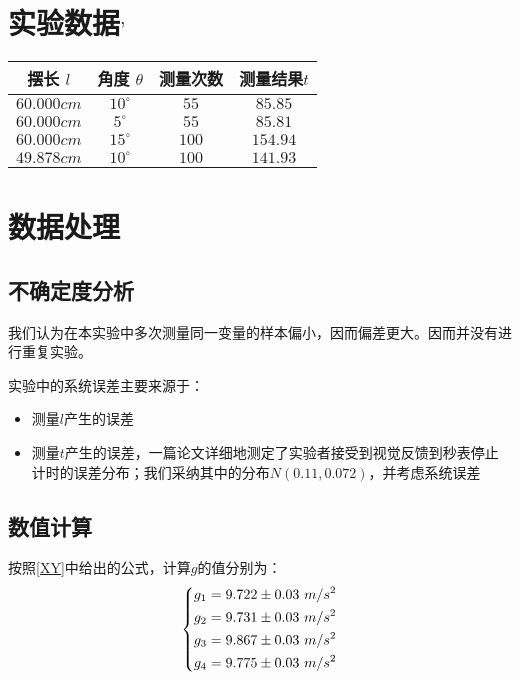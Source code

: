 \documentclass[a4paper]{ltxdoc}
\begin{document}
\begin{multicols}{2}
  \section[实验数据]{实验数据$^{,}$}
  \begin{tabular}{|c|c|c|c|}
    \hline \textbf{摆长 $l$} & \textbf{角度 $\theta$} & \textbf{测量次数} & \textbf{测量结果$t$} \\
    \hline $60.000cm$        & $10^{\circ}$           & $55$              & $85.85$              \\
    \hline $60.000cm$        & $5^{\circ}$            & $55$              & $85.81$              \\
    \hline $60.000cm$        & $15^{\circ}$           & $100$             & $154.94$             \\
    \hline $49.878cm$        & $10^{\circ}$           & $100$             & $141.93$             \\
    \hline
  \end{tabular}
  \section{数据处理}
  \subsection{不确定度分析}
  我们认为在本实验中多次测量同一变量的样本偏小，因而偏差更大。因而并没有进行重复实验。

  实验中的系统误差主要来源于：
  \begin{itemize}
    \item 测量$l$产生的误差
    \item 测量$t$产生的误差，一篇论文详细地测定了实验者接受到视觉反馈到秒表停止计时的误差分布；我们采纳其中的分布$N(0.11,0.072)$，并考虑系统误差
  \end{itemize}
  \subsection{数值计算}
  按照\eqref{XY}中给出的公式，计算$g$的值分别为：
  \begin{equation}
    \left\{
    \begin{aligned}
      g_1 & =9.722\pm 0.03\ m/s^2 \\
      g_2 & =9.731\pm 0.03\ m/s^2 \\
      g_3 & =9.867\pm 0.03\ m/s^2 \\
      g_4 & =9.775\pm 0.03\ m/s^2 \\
    \end{aligned}
    \notag{}
    \right.
  \end{equation}


\end{multicols}
\end{document}
